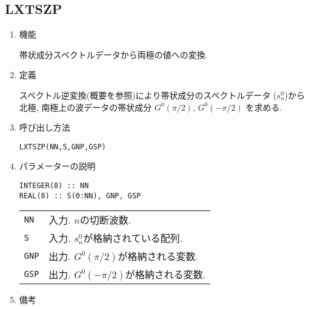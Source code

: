 \documentclass[a4j]{jarticle}
\begin{document}
\subsection{LXTSZP}

\begin{enumerate}

\item 機能 

帯状成分スペクトルデータから両極の値への変換.


\item 定義

スペクトル逆変換(概要を参照)により帯状成分のスペクトルデータ
($s^0_n$)から北極, 南極上の波データの帯状成分 $G^0(\pi/2)$,
$G^0(-\pi/2)$ を求める.
  
\item 呼び出し方法 

\texttt{LXTSZP(NN,S,GNP,GSP)}
  
\item パラメーターの説明

\begin{verbatim}
INTEGER(8) :: NN
REAL(8) :: S(0:NN), GNP, GSP
\end{verbatim}

\begin{tabular}{ll}
\texttt{NN} & 入力. $n$の切断波数.\\    
\texttt{S} & 入力. $s^0_n$が格納されている配列.\\
\texttt{GNP} & 出力. $G^0(\pi/2)$が格納される変数.\\
\texttt{GSP} & 出力. $G^0(-\pi/2)$が格納される変数.
\end{tabular}

\item 備考

\end{enumerate}
\end{document}
